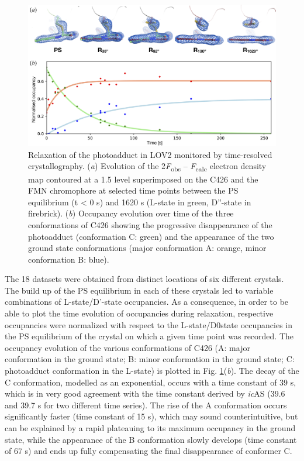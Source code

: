 \begin{figure}[H] %
    \centering
    \noindent \includegraphics[width=\textwidth]{images/LOV2/LOV2slow_Fig7.pdf}
    \caption{Relaxation of the photoadduct in LOV2 monitored by time-resolved crystallography. (\textit{a}) Evolution of the 2\textit{F}\textsubscript{obs} – \textit{F}\textsubscript{calc} electron density map contoured at a 1.5 \textsigma level superimposed on the C426 and the FMN chromophore at selected time points between the PS equilibrium (t < 0 s) and 1620 s (L-state in green, D''-state in firebrick). (\textit{b}) Occupancy evolution over time of the three conformations of C426 showing the progressive disappearance of the photoadduct (conformation C: green) and the appearance of the two ground state conformations (major conformation A: orange, minor conformation B: blue).}
    \label{fig:LOV2slowphotoadductdecay}
\end{figure}

The 18 datasets were obtained from distinct locations of six different crystals. The build up of the PS equilibrium in each of these crystals led to variable combinations of L-state/D'-state occupancies. As a consequence, in order to be able to plot the time evolution of occupancies during relaxation, respective occupancies were normalized with respect to the L-state/D0state occupancies in the PS equilibrium of the crystal on which a given time point was recorded. The occupancy evolution of the various conformations of C426 (A: major conformation in the ground state; B: minor conformation in the ground state; C: photoadduct conformation in the L-state) is plotted in Fig. \ref{fig:LOV2slowphotoadductdecay}(\textit{b}). The decay of the C conformation, modelled as an exponential, occurs with a time constant of 39 s, which is in very good agreement with the time constant derived by \textit{ic}AS (39.6 and 39.7 s for two different time series). The rise of the A conformation occurs significantly faster (time constant of 15 s), which may sound counterintuitive, but can be explained by a rapid plateauing to its maximum occupancy in the ground state, while the appearance of the B conformation slowly develops (time constant of 67 s) and ends up fully compensating the final disappearance of conformer C.


